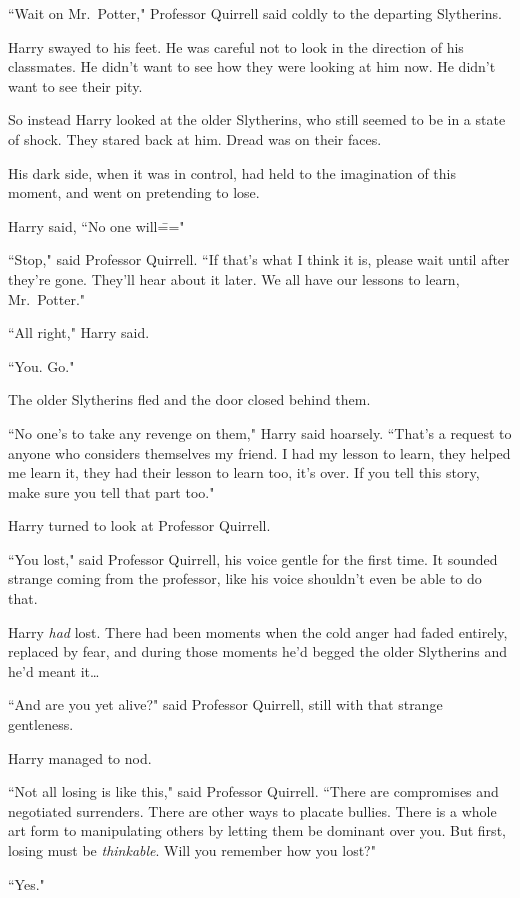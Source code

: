 ``Wait on Mr.~Potter," Professor Quirrell said coldly to the departing Slytherins.

Harry swayed to his feet. He was careful not to look in the direction of his classmates. He didn't want to see how they were looking at him now. He didn't want to see their pity.

So instead Harry looked at the older Slytherins, who still seemed to be in a state of shock. They stared back at him. Dread was on their faces.

His dark side, when it was in control, had held to the imagination of this moment, and went on pretending to lose.

Harry said, ``No one will\==="

``Stop," said Professor Quirrell. ``If that's what I think it is, please wait until after they're gone. They'll hear about it later. We all have our lessons to learn, Mr.~Potter."

``All right," Harry said.

``You. Go."

The older Slytherins fled and the door closed behind them.

``No one's to take any revenge on them," Harry said hoarsely. ``That's a request to anyone who considers themselves my friend. I had my lesson to learn, they helped me learn it, they had their lesson to learn too, it's over. If you tell this story, make sure you tell that part too."

Harry turned to look at Professor Quirrell.

``You lost," said Professor Quirrell, his voice gentle for the first time. It sounded strange coming from the professor, like his voice shouldn't even be able to do that.

Harry \emph{had} lost. There had been moments when the cold anger had faded entirely, replaced by fear, and during those moments he'd begged the older Slytherins and he'd meant it{\ldots}

``And are you yet alive?" said Professor Quirrell, still with that strange gentleness.

Harry managed to nod.

``Not all losing is like this," said Professor Quirrell. ``There are compromises and negotiated surrenders. There are other ways to placate bullies. There is a whole art form to manipulating others by letting them be dominant over you. But first, losing must be \emph{thinkable}. Will you remember how you lost?"

``Yes."

